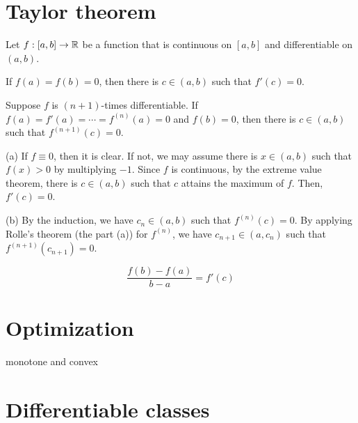 \documentclass{../../large}
\begin{document}
\section{Taylor theorem}
\begin{prb}
Let $f:[a,b]\to\mathbb{R}$ be a function that is continuous on $[a,b]$ and differentiable on $(a,b)$.
\begin{parts}
\item If $f(a)=f(b)=0$, then there is $c\in(a,b)$ such that $f'(c)=0$.
\item Suppose $f$ is $(n+1)$-times differentiable. If $f(a)=f'(a)=\cdots=f^{(n)}(a)=0$ and $f(b)=0$, then there is $c\in(a,b)$ such that $f^{(n+1)}(c)=0$.
\end{parts}
\end{prb}
\begin{pf}
(a)
If $f\equiv0$, then it is clear.
If not, we may assume there is $x\in(a,b)$ such that $f(x)>0$ by multiplying $-1$.
Since $f$ is continuous, by the extreme value theorem, there is $c\in(a,b)$ such that $c$ attains the maximum of $f$.
Then, $f'(c)=0$.

(b)
By the induction, we have $c_n\in(a,b)$ such that $f^{(n)}(c)=0$.
By applying Rolle's theorem (the part (a)) for $f^{(n)}$, we have $c_{n+1}\in(a,c_n)$ such that $f^{(n+1)}(c_{n+1})=0$.
\end{pf}

\begin{prb}
\[\frac{f(b)-f(a)}{b-a}=f'(c)\]
\end{prb}

\begin{prb}
\end{prb}


\section{Optimization}
\begin{prb}
\end{prb}

monotone and convex


\section{Differentiable classes}
\end{document}
